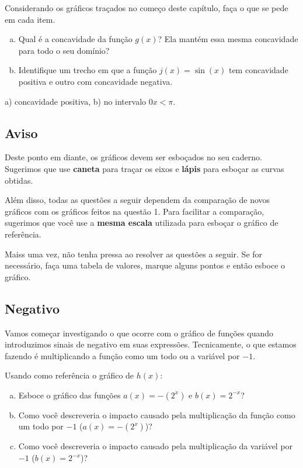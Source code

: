 \documentclass[main.tex]{subfiles}
\begin{document}
\begin{questao}
Considerando os gráficos traçados no começo deste capítulo, faça o que se pede em cada item.
\begin{enumerate}[a)]
\item Qual é a concavidade da função $g(x)$? Ela mantém essa mesma concavidade para todo o seu domínio?
\item Identifique um trecho em que a função $j(x)=\sin(x)$ tem concavidade positiva e outro com concavidade negativa.
\end{enumerate}
\end{questao}

\begin{gabarito}
	\begin{gabaritoQuestao}
		a) concavidade positiva, b) no intervalo $0x<\pi$.
	\end{gabaritoQuestao}
\end{gabarito}

\subsection*{Aviso}

Deste ponto em diante, os gráficos devem ser esboçados no seu caderno. Sugerimos que use \textbf{caneta} para traçar os eixos e \textbf{lápis} para esboçar as curvas obtidas.

Além disso, todas as questões a seguir dependem da comparação de novos gráficos com os gráficos feitos na questão 1. Para facilitar a comparação, sugerimos que você use a \textbf{mesma escala} utilizada para esboçar o gráfico de referência.

Maiss uma vez, não tenha pressa ao resolver as questões a seguir. Se for necessário, faça uma tabela de valores, marque alguns pontos e então esboce o gráfico.

\subsection*{Negativo}

Vamos começar investigando o que ocorre com o gráfico de funções quando introduzimos sinais de negativo em suas expressões. Tecnicamente, o que estamos fazendo é multiplicando a função como um todo ou a variável por $-1$.

\begin{questao}
Usando como referência o gráfico de $h(x)$:
\begin{enumerate}[a)]
\item Esboce o gráfico das funções $a(x)=-(2^x)$ e $b(x)=2^{-x}$?
\item Como você descreveria o impacto causado pela multiplicação da função como um todo por $-1$ ($a(x)=-(2^x)$)?
\item Como você descreveria o impacto causado pela multiplicação da variável por $-1$ ($b(x)=2^{-x}$)?
\end{enumerate}
\end{questao}
\end{document}
